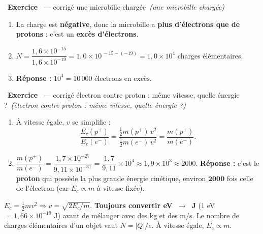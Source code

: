 \documentclass[11pt,a4paper]{article}
\newcommand{\pp}{p^{+}}
\newcommand{\ee}{e^{-}}
\newcommand{\rep}{\textbf{\color{excol}Réponse : }}
\newcounter{exo}
\newcommand{\cor}[1][]{\stepcounter{exo}\par\medskip%
  \noindent{\color{primary}\rule[-2pt]{3.5pt}{15pt}}\ \textbf{\color{primarydark}\large Exercice \theexo}%
  \ \textmd{\normalsize\color{black!55}— corrigé}%
  \ifx\relax#1\relax\relax\else\ \textmd{\normalsize\color{black!65}\itshape (#1)}\fi\par\nopagebreak\smallskip}
\begin{document}
\cor[une microbille chargée]
\begin{enumerate}[label=\alph*)]
  \item La charge est \textbf{négative}, donc la microbille a \textbf{plus d'électrons que de protons} :
        c'est un \textbf{excès d'électrons}.
  \item $N = \dfrac{1{,}6\times10^{-15}}{1{,}6\times10^{-19}}
        = 1{,}0\times10^{\,-15-(-19)} = 1{,}0\times10^{4}$ charges élémentaires.
  \item \rep $\boxed{10^{4} = 10\,000 \text{ électrons en excès}}$.
\end{enumerate}

\cor[électron contre proton : même vitesse, quelle énergie ?]
\begin{enumerate}[label=\alph*)]
  \item À vitesse égale, $v$ se simplifie :
        \[ \frac{E_c(\pp)}{E_c(\ee)} = \frac{\tfrac12 m(\pp)\,v^2}{\tfrac12 m(\ee)\,v^2}
             = \frac{m(\pp)}{m(\ee)}. \]
  \item $\dfrac{m(\pp)}{m(\ee)} = \dfrac{1{,}7\times10^{-27}}{9{,}11\times10^{-31}}
        = \dfrac{1{,}7}{9{,}11}\times10^{4} \approx 1{,}9\times10^{3} \approx 2000$.
        \; \rep c'est le \textbf{proton} qui possède la plus grande énergie cinétique, environ
        $\mathbf{2000}$ fois celle de l'électron (car $E_c \propto m$ à vitesse fixée).
\end{enumerate}

\begin{bilan}
$E_c=\tfrac12 m v^2 \Rightarrow v=\sqrt{2E_c/m}$. \textbf{Toujours convertir eV~$\to$~J}
($1$ eV $=1{,}66\times10^{-19}$ J) avant de mélanger avec des kg et des m/s. Le nombre de charges
élémentaires d'un objet vaut $N = |Q|/e$. À vitesse égale, $E_c \propto m$.
\end{bilan}
\end{document}
